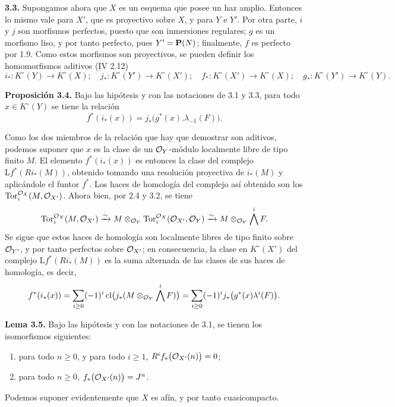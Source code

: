 \providecommand{\sisi}[2]{#2}

\textbf{3.3.} Supongamos ahora que \(X\) es un esquema que posee un haz amplio. Entonces lo mismo vale para \(X'\), que es proyectivo sobre \(X\), y para \(Y\) e \(Y'\). Por otra parte, \(i\) y \(j\) son morfismos perfectos, puesto que son inmersiones regulares; \(g\) es un morfismo liso, y por tanto perfecto, pues \(Y'=\mathbf P(N)\); finalmente, \(f\) es perfecto por 1.9. Como estos morfismos son proyectivos, se pueden definir los homomorfismos aditivos \sisi{(IV}{(IV 2.12)}
\[
i_*:K^\circ(Y)\to K^\circ(X);\quad
j_*:K^\circ(Y')\to K^\circ(X');\quad
f_*:K^\circ(X')\to K^\circ(X);\quad
g_*:K^\circ(Y')\to K^\circ(Y).
\]

\textbf{Proposición 3.4.} Bajo las hipótesis y con las notaciones de 3.1 y 3.3, para todo \(x\in K^\circ(Y)\) se tiene la relación
\[
f^*(i_*(x))=j_*\bigl(g^*(x).\lambda_{-1}(F)\bigr).
\]

Como los dos miembros de la relación que hay que demostrar son aditivos, podemos suponer que \(x\) es la clase de un \(\mathcal O_Y\)-módulo localmente libre de tipo finito \(M\). El elemento \(f^*(i_*(x))\) es entonces la clase del complejo \(\mathrm Lf^*(Ri_*(M))\), obtenido tomando una resolución proyectiva de \(i_*(M)\) y aplicándole el funtor \(f^*\). Los haces de homología del complejo así obtenido son los \(\operatorname{Tor}_i^{\mathcal O_X}(M,\mathcal O_{X'})\). Ahora bien, por 2.4 y 3.2, se tiene
\[
\operatorname{Tor}_i^{\mathcal O_X}(M,\mathcal O_{X'})
\xrightarrow{\sim}
M\otimes_{\mathcal O_Y}\operatorname{Tor}_i^{\mathcal O_X}(\mathcal O_{X'},\mathcal O_Y)
\xrightarrow{\sim}
M\otimes_{\mathcal O_Y}\bigwedge^iF.
\]
Se sigue que estos haces de homología son localmente libres de tipo finito sobre \(\mathcal O_{Y'}\), y por tanto perfectos sobre \(\mathcal O_{X'}\); en consecuencia, la clase en \(K^\circ(X')\) del complejo \(\mathrm Lf^*(Ri_*(M))\) es la suma alternada de las clases de sus haces de homología, es decir,
\[
f^*(i_*(x))
=\sum_{i\ge0}(-1)^i\operatorname{cl}
\bigl(j_*(M\otimes_{\mathcal O_Y}\bigwedge^iF)\bigr)
=\sum_{i\ge0}(-1)^i
j_*\bigl(g^*(x)\lambda^i(F)\bigr).
\]

\textbf{Lema 3.5.} Bajo las hipótesis y con las notaciones de 3.1, se tienen los isomorfismos siguientes:
\begin{enumerate}[label=\roman*)]
\item para todo \(n\ge0\), y para todo \(i\ge1\), \(R^if_*\bigl(\mathcal O_{X'}(n)\bigr)=0\);
\item para todo \(n\ge0\), \(f_*\bigl(\mathcal O_{X'}(n)\bigr)=J^n\).
\end{enumerate}
Podemos suponer evidentemente que \(X\) es afín, y por tanto cuasicompacto.

